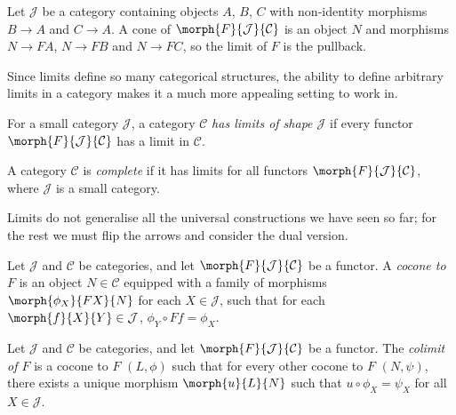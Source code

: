 \begin{example}[Pullbacks]\label{ex:pullback-limit}
    Let \(\mathcal{J}\) be a category containing objects \(A\), \(B\),
    \(C\) with non-identity morphisms \(B \to A\) and \(C \to A\).
    A cone of \(\morph{F}{\mathcal{J}}{\mathcal{C}}\) is an object \(N\) and
    morphisms \(N \to FA\), \(N \to FB\) and \(N \to FC\), so the limit of
    \(F\) is the pullback.
\end{example}

Since limits define so many categorical structures, the ability to define
arbitrary limits in a category makes it a much more appealing setting to work
in.

\begin{definition}
    For a small category \(\mathcal{J}\), a category \(\mathcal{C}\)
    \emph{has limits of shape \(\mathcal{J}\)} if every functor
    \(\morph{F}{\mathcal{J}}{\mathcal{C}}\) has a limit in \(\mathcal{C}\).
\end{definition}

\begin{definition}
    A category \(\mathcal{C}\) is \emph{complete} if it has limits for all
    functors \(\morph{F}{\mathcal{J}}{\mathcal{C}}\), where \(\mathcal{J}\) is a
    small category.
\end{definition}

Limits do not generalise all the universal constructions we have seen so far;
for the rest we must flip the arrows and consider the dual version.

\begin{definition}[Cocone]
    Let \(\mathcal{J}\) and \(\mathcal{C}\) be categories, and let
    \(\morph{F}{\mathcal{J}}{\mathcal{C}}\) be a functor.
    A \emph{cocone to \(F\)} is an object \(N \in \mathcal{C}\) equipped with
    a family of morphisms \(\morph{\phi_X}{FX}{N}\) for each
    \(X \in \mathcal{J}\), such that for each
    \(\morph{f}{X}{Y} \in \mathcal{J}\),
    \(\phi_Y \circ Ff = \phi_X\).
    \begin{center}
        
    \end{center}
\end{definition}

\begin{definition}[Colimit]
    Let \(\mathcal{J}\) and \(\mathcal{C}\) be categories, and let
    \(\morph{F}{\mathcal{J}}{\mathcal{C}}\) be a functor.
    The \emph{colimit of \(F\)} is a cocone to \(F\) \((L,\phi)\) such that for
    every other cocone to \(F\) \((N, \psi)\), there exists a unique morphism
    \(\morph{u}{L}{N}\) such that \(u \circ \phi_X = \psi_X\) for all
    \(X \in \mathcal{J}\).
    \begin{center}
        
    \end{center}
\end{definition}

